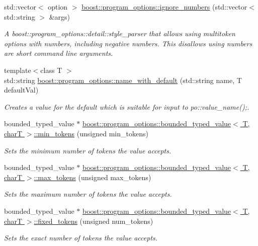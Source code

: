 \begin{DoxyCompactItemize}
std\+::vector$<$ option $>$ \hyperlink{group___utility_module_ga3db1b0bae61386198482fae1645b959d}{boost\+::program\+\_\+options\+::ignore\+\_\+numbers} (std\+::vector$<$ std\+::string $>$ \&args)
\begin{DoxyCompactList}\small\item\em A boost\+::program\+\_\+options\+::detail\+::style\+\_\+parser that allows using multitoken options with numbers, including negative numbers. This disallows using numbers are short command line arguments. \end{DoxyCompactList}\item 
{\footnotesize template$<$class T $>$ }\\std\+::string \hyperlink{group___utility_module_ga8b756cf9f42d2452f48d168883c76f4f}{boost\+::program\+\_\+options\+::name\+\_\+with\+\_\+default} (std\+::string name, T default\+Val)
\begin{DoxyCompactList}\small\item\em Creates a value for the default which is suitable for input to po\+::value\+\_\+name();. \end{DoxyCompactList}\item 
bounded\+\_\+typed\+\_\+value $\ast$ \hyperlink{group___utility_module_ga92bfc58add0451fb2f594e7b78ff966c}{boost\+::program\+\_\+options\+::bounded\+\_\+typed\+\_\+value$<$ T, char\+T $>$\+::min\+\_\+tokens} (unsigned min\+\_\+tokens)
\begin{DoxyCompactList}\small\item\em Sets the minimum number of tokens the value accepts. \end{DoxyCompactList}\item 
bounded\+\_\+typed\+\_\+value $\ast$ \hyperlink{group___utility_module_ga88b81b9c4d7c1f667594d6e1490078ff}{boost\+::program\+\_\+options\+::bounded\+\_\+typed\+\_\+value$<$ T, char\+T $>$\+::max\+\_\+tokens} (unsigned max\+\_\+tokens)
\begin{DoxyCompactList}\small\item\em Sets the maximum number of tokens the value accepts. \end{DoxyCompactList}\item 
bounded\+\_\+typed\+\_\+value $\ast$ \hyperlink{group___utility_module_ga1a9caf446ce6f236f70dfd6a54885478}{boost\+::program\+\_\+options\+::bounded\+\_\+typed\+\_\+value$<$ T, char\+T $>$\+::fixed\+\_\+tokens} (unsigned num\+\_\+tokens)
\begin{DoxyCompactList}\small\item\em Sets the exact number of tokens the value accepts. \end{DoxyCompactList}\item 

\end{DoxyCompactItemize}
